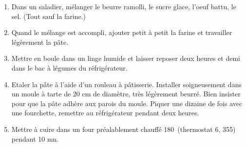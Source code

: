 
\begin{ingredients}
\end{ingredients}

\begin{recipe}
  \begin{enumerate}

  \item Dans un saladier, m\'elanger le beurre ramolli, le sucre glace, l'oeuf
    battu, le sel.  (Tout sauf la farine.)

  \item 
    Quand le m\'elange est accompli, ajouter petit \`a petit la farine et
    travailler l\'eg\`erement la p\^ate.

  \item 
    Mettre en boule dans un linge humide et laisser reposer deux heures et
    demi dans le bac \`a l\'egumes du r\'efrig\'erateur.

  \item 
    Etaler la p\^ate \`a l'aide d'un rouleau \`a p\^atisserie.
    Installer soigneusement dans un moule \`a tarte de 20 cm de diam\`etre,
    tr\`es l\'eg\`erement beurr\'e.
    Bien insister pour que la p\^ate adh\`ere aux parois du moule. Piquer une
    dizaine de fois avec une fourchette, remettre au r\'efrig\'erateur pendant
    deux heures.

  \item Mettre \`a cuire dans un four pr\'ealablement chauff\'e 180\C\
    (thermostat 6, 355\F) pendant 10 mn.

  \end{enumerate}
\end{recipe}


\begin{ingredients}
\end{ingredients}


